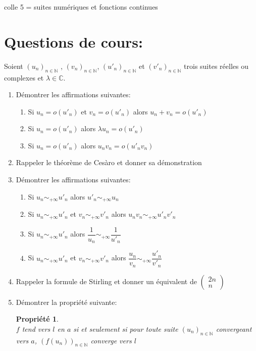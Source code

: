 \documentclass[a4paper,10pt]{article}
\newtheorem*{pro}{Propriété}
\theoremstyle{definition}
\theoremstyle{definition}
\newcommand{\C}{\mathbb{C}}
\newcommand{\N}{\mathbb{N}}
\begin{document}
	
	
	\begin{center}
		\Large \sc colle 5 = suites numériques et fonctions continues
	\end{center}
	
\section *{Questions de cours:}
\noindent Soient $(u_n)_{n\in\N}$ , $(v_n)_{n\in\N}$,  $(u'_n)_{n\in\N}$ et $(v'_n)_{n\in\N}$ trois suites réelles ou complexes et $\lambda \in \C $. 
\begin{enumerate} %
\item Démontrer les affirmations suivantes: \begin{enumerate}
\item Si $u_n= o\left(u'_n\right)$ et $v_n = o\left(u'_n\right)$ alors $u_n+v_n = o\left(u'_n\right)$
\item Si $u_n= o\left(u'_n\right)$ alors $\lambda u_n= o\left(u'_n\right)$ 
\item  Si $u_n= o\left(u'_n\right)$ alors $ u_nv_n= o\left(u'_nv_n\right)$ 
\end{enumerate}
\item Rappeler le théorème de Cesàro et donner sa démonstration
\item Démontrer les affirmations suivantes: \begin{enumerate}
\item Si $u_n \sim_{+\infty}u'_n$ alors $u'_n \sim_{+\infty}u_n$
\item  Si $u_n \sim_{+\infty}u'_n$ et $v_n \sim_{+\infty}v'_n$ alors $u_nv_n \sim_{+\infty}u'_nv'_n$ 
\item Si $u_n \sim_{+\infty}u'_n$ alors $\dfrac{1}{u_n} \sim_{+\infty}\dfrac{1}{u'_n}$
\item Si $u_n \sim_{+\infty}u'_n$ et $v_n \sim_{+\infty}v'_n$ alors $\dfrac{u_n}{v_n} \sim_{+\infty}\dfrac{u'_n}{v'_n}$ 
\end{enumerate}
\item Rappeler la formule de Stirling et donner un équivalent de $\left(\begin{matrix}
2n\\n
\end{matrix}\right)$
\item Démontrer la propriété suivante:
\begin{pro}\hfil\\
$f$ tend vers $l$  en $a$ si et seulement si  pour toute suite $(u_n)_{n\in\N}$ convergeant vers $a$, $(f(u_n))_{n\in\N}$ converge vers $l$
\end{pro} 
\end{enumerate}
\end{document}
